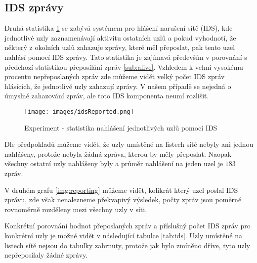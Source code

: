 \documentclass[11pt,final,twoside]{fithesis2}
\begin{document}
\subsection{IDS zprávy}

Druhá statistika \ref{img:reported} se zabývá systémem pro hlášení narušení sítě (IDS), kde jednotlivé uzly zaznamenávají aktivitu ostatních uzlů a pokud vyhodnotí, že některý z okolních uzlů zahazuje 
zprávy, které měl přeposlat, pak tento uzel nahlásí pomocí IDS zprávy. Tato statistika je zajímavá především v porovnání s předchozí statistikou přeposílání zpráv \ref{sub:alive}. Vzhledem k velmi vysokému 
procentu nepřeposlaných zpráv zde můžeme vidět velký počet IDS zpráv hlásících, že jednotlivé uzly zahazují zprávy. V našem případě se nejedná o úmyslné zahazování zpráv, ale toto IDS komponenta neumí 
rozlišit.

\begin{figure}[h]
     \centering
     \texttt{[image: images/idsReported.png]}
     \caption{Experiment - statistika nahlášení jednotlivých uzlů pomocí IDS}
     \label{img:reported}
\end{figure}

Dle předpokladů můžeme vidět, že uzly umístěné na listech sítě nebyly ani jednou nahlášeny, protože nebyla žádná zpráva, kterou by měly přeposlat. Naopak všechny ostatní uzly nahlášeny 
byly a průměr nahlášení na jeden uzel je $183$ zpráv. 

V druhém grafu \ref{img:reporting} můžeme vidět, kolikrát který uzel poslal IDS zprávu, zde však nenalezneme překvapivý výsledek, počty zpráv jsou poměrně rovnoměrně rozděleny mezi všechny uzly v síti. 

Konkrétní porovnání hodnot přeposlaných zpráv a příslušný počet IDS zpráv pro konkrétní uzly je možné vidět v následující tabulce 
\ref{tab:ids}. Uzly umístěné na listech sítě nejsou do tabulky zahrnuty, protože jak 
bylo zmíněno dříve, tyto uzly nepřeposílaly žádné zprávy. 
\end{document}
